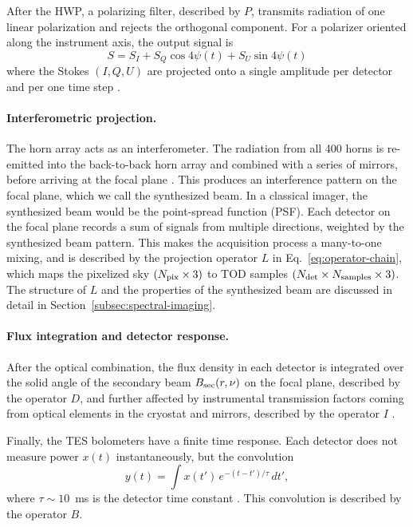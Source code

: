 \documentclass[a4paper,11pt]{article}
\begin{document}
After the HWP, a polarizing filter, described by $P$, transmits radiation of one linear polarization and rejects the orthogonal component. For a polarizer oriented along the instrument axis, the output signal is \begin{equation}
    S = S_I + S_Q \cos 4\psi(t) + S_U \sin 4\psi(t)
    \label{eq:polarizer}
\end{equation}
where the Stokes $(I,Q,U)$ are projected onto a single amplitude per detector and per one time step \cite{mousset2022qubic2}.

\paragraph{Interferometric projection.}
The horn array acts as an interferometer. The radiation from all 400 horns is re-emitted into the back-to-back horn array and combined with a series of mirrors, before
arriving at the focal plane \cite{mousset2022qubic2,
torchinsky2022qubic3}. This produces an interference
pattern on the focal plane, which we call the synthesized beam. In a classical imager, the synthesized beam would be the point-spread function (PSF). Each detector on the focal plane records a sum of signals from multiple directions, weighted by the synthesized beam
pattern. This makes the acquisition process a many-to-one mixing, and is described by the projection operator $L$ in Eq.~\ref{eq:operator-chain}, which maps the pixelized sky
$(N_{\rm pix} \times 3)$ to TOD samples $(N_{\rm det} \times N_{\rm samples} \times 3)$. The structure of $L$ and the properties of the synthesized beam are discussed in detail in
Section~\ref{subsec:spectral-imaging}. 

\paragraph{Flux integration and detector response.}
After the optical combination, the flux density in each detector is integrated over the solid angle of the secondary beam $B_{\rm sec}(r,\nu)$ on the focal plane, described by the operator $D$, and further affected by instrumental transmission
factors coming from optical elements in the cryostat and mirrors, described by the operator $I$ \cite{mousset2022qubic2}.

Finally, the TES bolometers have a finite time response. Each detector does not measure power $x(t)$ instantaneously, but the convolution
\begin{equation}
    y(t) = \int x(t')\,e^{-(t-t')/\tau}\,dt',
    \label{eq:detector-response}
\end{equation}
where $\tau \sim 10$~ms is the detector time constant \cite{mousset2022qubic2}. This convolution is described by the operator $B$.
\end{document}
